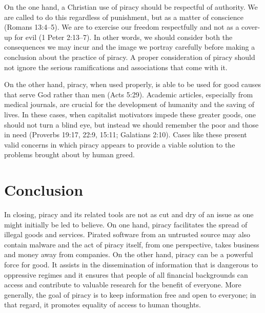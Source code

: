 \documentclass[onecolumn, 12pt]{article}
\begin{document}
\begin{refsection}
On the one hand, a Christian use of piracy should be respectful of authority.
We are called to do this regardless of punishment, but as a matter of
conscience (Romans 13:4--5). We are to exercise our freedom respectfully and
not as a cover-up for evil (1 Peter 2:13--7). In other words, we should consider
both the consequences we may incur and the image we portray carefully before
making a conclusion about the practice of piracy. A proper consideration of
piracy should not ignore the serious ramifications and associations that come
with it.

On the other hand, piracy, when used properly, is able to be used for good
causes that serve God rather than men (Acts 5:29). Academic articles,
especially from medical journals, are crucial for the development of humanity
and the saving of lives. In these cases, when capitalist motivators impede these
greater goods, one should not turn a blind eye, but instead we should remember
the poor and those in need (Proverbs 19:17, 22:9, 15:11; Galatians 2:10). Cases
like these present valid concerns in which piracy appears to provide a viable
solution to the problems brought about by human greed.

\section{Conclusion}
In closing, piracy and its related tools are not as cut and dry of an issue as one might
initially be led to believe. On one hand, piracy facilitates the spread of illegal goods
and services. Pirated software from an untrusted source may also contain malware and the
act of piracy itself, from one perspective, takes business and money away from companies.
On the other hand, piracy can be a powerful force for good. It assists in the
dissemination of information that is dangerous to oppressive regimes and it ensures that
people of all financial backgrounds can access and contribute to valuable research for the
benefit of everyone. More generally, the goal of piracy is to keep information free and
open to everyone; in that regard, it promotes equality of access to human thoughts.


\end{refsection}
\end{document}
